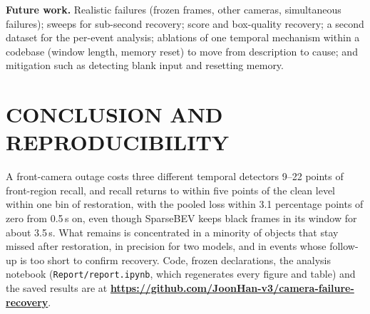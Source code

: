 \documentclass[letterpaper, 10 pt, conference]{ieeeconf}
\begin{document}
\textbf{Future work.} Realistic failures (frozen frames, other cameras, simultaneous failures); sweeps for sub-second recovery; score and box-quality recovery; a second dataset for the per-event analysis; ablations of one temporal mechanism within a codebase (window length, memory reset) to move from description to cause; and mitigation such as detecting blank input and resetting memory.

\section{CONCLUSION AND REPRODUCIBILITY}

A front-camera outage costs three different temporal detectors 9--22 points of front-region recall, and recall returns to within five points of the clean level within one bin of restoration, with the pooled loss within 3.1 percentage points of zero from 0.5\,s on,
even though SparseBEV keeps black frames in its window for about 3.5\,s. What remains is concentrated in a minority of objects that stay missed after restoration, in precision for two models, and in events whose follow-up is too short to confirm recovery.
Code, frozen declarations, the analysis notebook (\texttt{Report/report.ipynb}, which regenerates every figure and table) and the saved results are at \textbf{\url{https://github.com/JoonHan-v3/camera-failure-recovery}}.
\end{document}
